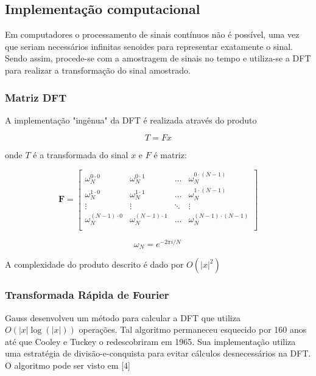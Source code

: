 \documentclass[brazil,times]{abnt}
\begin{document}
	\subsection*{Implementação computacional}
		Em computadores o processamento de sinais contínuos não é possível, uma vez que seriam necessários infinitas senoides para representar exatamente o sinal. Sendo assim, procede-se com a amostragem de sinais no tempo e utiliza-se a DFT para realizar a transformação do sinal amostrado.

		\subsubsection*{Matriz DFT}
			A implementação "ingênua" da DFT é realizada através do produto

			$$ T = Fx$$

			onde $T$ é a transformada do sinal $x$ e $F$ é matriz:

			$$
			\mathbf{F} =
			\begin{bmatrix}
				\omega_N^{0 \cdot 0}     & \omega_N^{0 \cdot 1}     & \ldots & \omega_N^{0 \cdot (N-1)}     \\
				\omega_N^{1 \cdot 0}     & \omega_N^{1 \cdot 1}     & \ldots & \omega_N^{1 \cdot (N-1)}     \\
				\vdots                   & \vdots                   & \ddots & \vdots                       \\
				\omega_N^{(N-1) \cdot 0} & \omega_N^{(N-1) \cdot 1} & \ldots & \omega_N^{(N-1) \cdot (N-1)} \\
			\end{bmatrix}
			$$

			$$\omega_N = e^{-2 \pi i/N}\,$$

			A complexidade do produto descrito é dado por $O(|x|^2)$

		\subsubsection*{Transformada Rápida de Fourier}
			Gauss desenvolveu um método para calcular a DFT que utiliza $O(|x|\log(|x|))$ operações. Tal algoritmo permaneceu esquecido por 160 anos até que Cooley e Tuckey o redescobriram em 1965. Sua implementação utiliza uma estratégia de divisão-e-conquista para evitar cálculos desnecessários na DFT. O algoritmo pode ser visto em [4]


\end{document}
